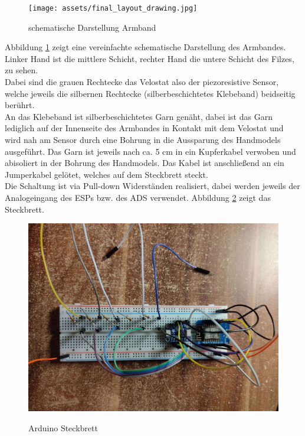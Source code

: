 \documentclass[11pt, a4paper]{article}
\begin{document}
\begin{figure}
	\centering
	\texttt{[image: assets/final\_layout\_drawing.jpg]}
	\caption{schematische Darstellung Armband}
	\label{fig:final_layout}
\end{figure}

Abbildung \ref{fig:final_layout} zeigt eine vereinfachte schematische Darstellung des Armbandes. Linker Hand ist die mittlere Schicht, rechter Hand die untere Schicht des Filzes, zu sehen.\\
 Dabei sind die grauen Rechtecke das Velostat also der piezoresistive Sensor, welche jeweils die silbernen Rechtecke (silberbeschichtetes Klebeband) beidseitig berührt.\\ 
 An das Klebeband ist silberbeschichtetes Garn genäht, dabei ist das Garn lediglich auf der Innenseite des Armbandes in Kontakt mit dem Velostat und wird nah am Sensor durch eine Bohrung in die Aussparung des Handmodels ausgeführt.
 Das Garn ist jeweils nach ca. 5 cm in ein Kupferkabel verwoben und abisoliert in der Bohrung des Handmodels. Das Kabel ist anschließend an ein Jumperkabel gelötet, welches auf dem Steckbrett steckt.\\
 Die Schaltung ist via Pull-down Widerständen realisiert, dabei werden jeweils der Analogeingang des ESPs bzw. des ADS verwendet. Abbildung \ref{fig:Arduino_wiring} zeigt das Steckbrett.

 \begin{figure}
	\centering
	\includegraphics[scale=0.05]{assets/Arduino_wiring.jpg}
	\label{fig:Arduino_wiring}
	\caption{Arduino Steckbrett}
 \end{figure}
\end{document}
